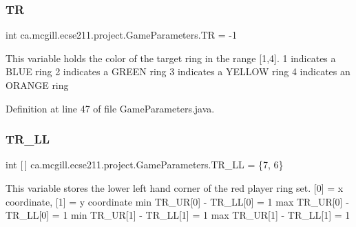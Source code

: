 \mbox{\label{classca_1_1mcgill_1_1ecse211_1_1project_1_1_game_parameters_a5a299e93e098c89d12be1072947d3bcb}} 
\subsubsection{\texorpdfstring{TR}{TR}}
{\footnotesize\ttfamily int ca.\+mcgill.\+ecse211.\+project.\+Game\+Parameters.\+TR = -\/1\hspace{0.3cm}{\ttfamily [static]}}

This variable holds the color of the target ring in the range \mbox{[}1,4\mbox{]}. 1 indicates a B\+L\+UE ring 2 indicates a G\+R\+E\+EN ring 3 indicates a Y\+E\+L\+L\+OW ring 4 indicates an O\+R\+A\+N\+GE ring 

Definition at line 47 of file Game\+Parameters.\+java.

\mbox{\label{classca_1_1mcgill_1_1ecse211_1_1project_1_1_game_parameters_ac642730053a35524ce70866289ca10b9}} 
\subsubsection{\texorpdfstring{T\+R\+\_\+\+LL}{TR\_LL}}
{\footnotesize\ttfamily int \mbox{[}$\,$\mbox{]} ca.\+mcgill.\+ecse211.\+project.\+Game\+Parameters.\+T\+R\+\_\+\+LL = \{7, 6\}\hspace{0.3cm}{\ttfamily [static]}}

This variable stores the lower left hand corner of the red player ring set. \mbox{[}0\mbox{]} = x coordinate, \mbox{[}1\mbox{]} = y coordinate min T\+R\+\_\+\+UR\mbox{[}0\mbox{]} -\/ T\+R\+\_\+\+LL\mbox{[}0\mbox{]} = 1 max T\+R\+\_\+\+UR\mbox{[}0\mbox{]} -\/ T\+R\+\_\+\+LL\mbox{[}0\mbox{]} = 1 min T\+R\+\_\+\+UR\mbox{[}1\mbox{]} -\/ T\+R\+\_\+\+LL\mbox{[}1\mbox{]} = 1 max T\+R\+\_\+\+UR\mbox{[}1\mbox{]} -\/ T\+R\+\_\+\+LL\mbox{[}1\mbox{]} = 1 

